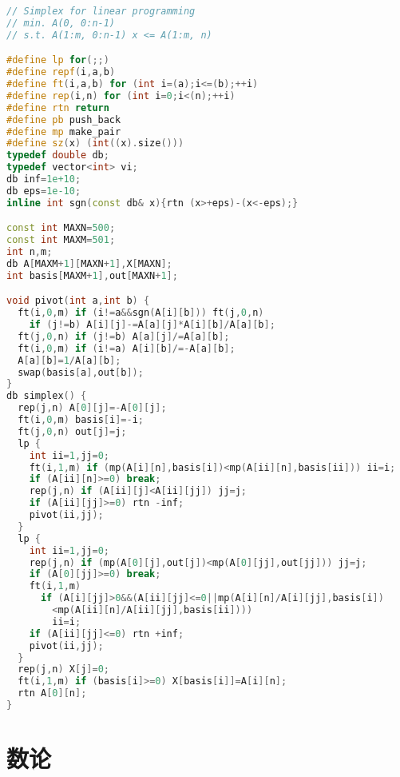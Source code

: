 \begin{lstlisting}[language=C++]
// Simplex for linear programming
// min. A(0, 0:n-1)
// s.t. A(1:m, 0:n-1) x <= A(1:m, n)

#define lp for(;;)
#define repf(i,a,b)
#define ft(i,a,b) for (int i=(a);i<=(b);++i)
#define rep(i,n) for (int i=0;i<(n);++i)
#define rtn return
#define pb push_back
#define mp make_pair
#define sz(x) (int((x).size()))
typedef double db;
typedef vector<int> vi;
db inf=1e+10;
db eps=1e-10;
inline int sgn(const db& x){rtn (x>+eps)-(x<-eps);}

const int MAXN=500;
const int MAXM=501;
int n,m;
db A[MAXM+1][MAXN+1],X[MAXN];
int basis[MAXM+1],out[MAXN+1];

void pivot(int a,int b) {
  ft(i,0,m) if (i!=a&&sgn(A[i][b])) ft(j,0,n)
    if (j!=b) A[i][j]-=A[a][j]*A[i][b]/A[a][b];
  ft(j,0,n) if (j!=b) A[a][j]/=A[a][b];
  ft(i,0,m) if (i!=a) A[i][b]/=-A[a][b];
  A[a][b]=1/A[a][b];
  swap(basis[a],out[b]);
}
db simplex() {
  rep(j,n) A[0][j]=-A[0][j];
  ft(i,0,m) basis[i]=-i;
  ft(j,0,n) out[j]=j;
  lp {
    int ii=1,jj=0;
    ft(i,1,m) if (mp(A[i][n],basis[i])<mp(A[ii][n],basis[ii])) ii=i;
    if (A[ii][n]>=0) break;
    rep(j,n) if (A[ii][j]<A[ii][jj]) jj=j;
    if (A[ii][jj]>=0) rtn -inf;
    pivot(ii,jj);
  }
  lp {
    int ii=1,jj=0;
    rep(j,n) if (mp(A[0][j],out[j])<mp(A[0][jj],out[jj])) jj=j;
    if (A[0][jj]>=0) break;
    ft(i,1,m)
      if (A[i][jj]>0&&(A[ii][jj]<=0||mp(A[i][n]/A[i][jj],basis[i])
        <mp(A[ii][n]/A[ii][jj],basis[ii])))
        ii=i;
    if (A[ii][jj]<=0) rtn +inf;
    pivot(ii,jj);
  }
  rep(j,n) X[j]=0;
  ft(i,1,m) if (basis[i]>=0) X[basis[i]]=A[i][n];
  rtn A[0][n];
}

\end{lstlisting}
\section{数论}
